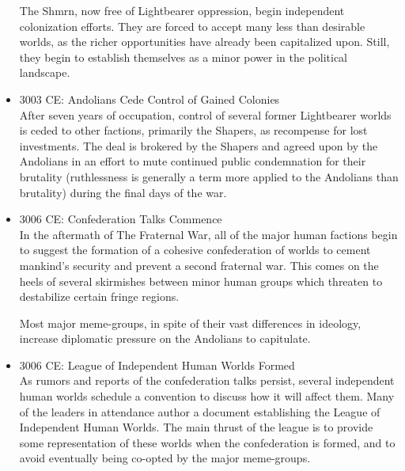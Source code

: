 \begin{itemize}
The Shmrn, now free of Lightbearer oppression, begin independent
colonization efforts.  They are forced to accept many less than
desirable worlds, as the richer opportunities have already been
capitalized upon.  Still, they begin to establish themselves as a
minor power in the political landscape.


\item 3003 CE: Andolians Cede Control of Gained Colonies \\

After seven years of occupation, control of several former Lightbearer
worlds is ceded to other factions, primarily the Shapers, as
recompense for lost investments.  The deal is brokered by the Shapers
and agreed upon by the Andolians in an effort to mute continued public
condemnation for their brutality (ruthlessness is generally a term
more applied to the Andolians than brutality) during the final days of
the war.

\item 3006 CE: Confederation Talks Commence \\

In the aftermath of The Fraternal War, all of the major human factions
begin to suggest the formation of a cohesive confederation of worlds
to cement mankind's security and prevent a second fraternal war.  This
comes on the heels of several skirmishes between minor human groups
which threaten to destabilize certain fringe regions.

Most major meme-groups, in spite of their vast differences in
ideology, increase diplomatic pressure on the Andolians to capitulate.

\item 3006 CE: League of Independent Human Worlds Formed \\

As rumors and reports of the confederation talks persist, several
independent human worlds schedule a convention to discuss how it will
affect them.  Many of the leaders in attendance author a document
establishing the League of Independent Human Worlds.  The main thrust
of the league is to provide some representation of these worlds when
the confederation is formed, and to avoid eventually being co-opted by
the major meme-groups.

\end{itemize}

